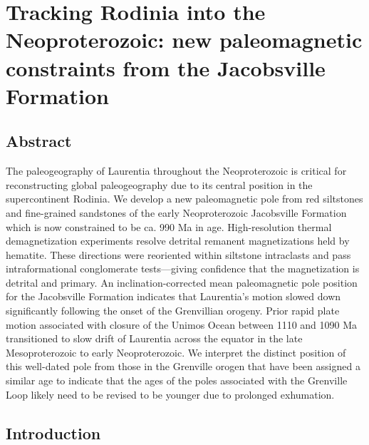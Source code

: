 \chapter{Tracking Rodinia into the Neoproterozoic: new paleomagnetic constraints from the Jacobsville Formation}

\section{Abstract}
The paleogeography of Laurentia throughout the Neoproterozoic is critical for reconstructing global paleogeography due to its central position in the supercontinent Rodinia. We develop a new paleomagnetic pole from red siltstones and fine-grained sandstones of the early Neoproterozoic Jacobsville Formation which is now constrained to be ca. 990 Ma in age. High-resolution thermal demagnetization experiments resolve detrital remanent magnetizations held by hematite. These directions were reoriented within siltstone intraclasts and pass intraformational conglomerate tests---giving confidence that the magnetization is detrital and primary. An inclination-corrected mean paleomagnetic pole position for the Jacobsville Formation indicates that Laurentia's motion slowed down significantly following the onset of the Grenvillian orogeny. Prior rapid plate motion associated with closure of the Unimos Ocean between 1110 and 1090 Ma transitioned to slow drift of Laurentia across the equator in the late Mesoproterozoic to early Neoproterozoic. We interpret the distinct position of this well-dated pole from those in the Grenville orogen that have been assigned a similar age to indicate that the ages of the poles associated with the Grenville Loop likely need to be revised to be younger due to prolonged exhumation. 

\section{Introduction}

